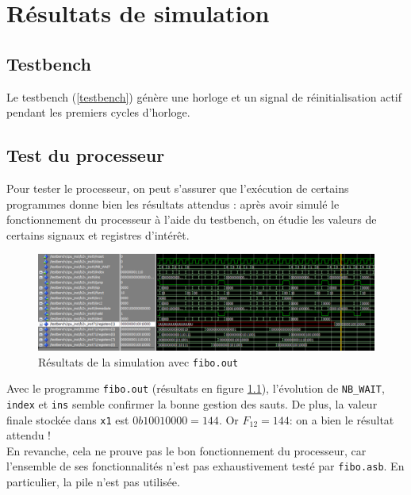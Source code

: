 \chapter{Résultats de simulation}
\label{ch:simulation}

\section{Testbench}

Le testbench (\ref{testbench}) génère une horloge et un signal de
réinitialisation actif pendant les premiers cycles d'horloge.



\section{Test du processeur}

Pour tester le processeur, on peut s'assurer que l'exécution de certains
programmes donne bien les résultats attendus : après avoir simulé le
fonctionnement du processeur à l'aide du testbench, on étudie les valeurs de
certains signaux et registres d'intérêt. \\

\begin{figure}[h]
    \centering
    \includegraphics[width=\textwidth]{figures/simulation.png}
    \caption{Résultats de la simulation avec \texttt{fibo.out}}
    \label{fig:simulation}
\end{figure}

Avec le programme \texttt{fibo.out} (résultats en figure \ref{fig:simulation}),
l'évolution de \texttt{NB\_WAIT}, \texttt{index} et \texttt{ins} semble
confirmer la bonne gestion des sauts. De plus, la valeur finale stockée dans
\texttt{x1} est $0b10010000 = 144$. Or $F_{12} = 144$: on a bien le résultat
attendu ! \\

En revanche, cela ne prouve pas le bon fonctionnement du processeur, car
l'ensemble de ses fonctionnalités n'est pas exhaustivement testé par
\texttt{fibo.asb}. En particulier, la pile n'est pas utilisée.
